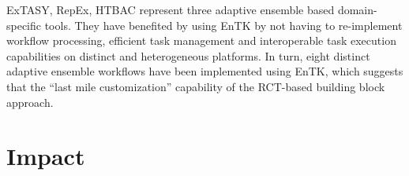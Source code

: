 \documentclass[preprint,12pt, a4paper]{elsarticle}
\begin{document}

ExTASY, RepEx, HTBAC represent three adaptive ensemble based domain-specific
tools. They have benefited by using EnTK by not having to re-implement
workflow processing, efficient task management and interoperable task
execution capabilities on distinct and heterogeneous platforms. In turn, eight
distinct adaptive ensemble workflows have been implemented using EnTK, which
suggests that the ``last mile customization'' capability of the RCT-based
building block approach.



\section{Impact}\label{sec:impact}


\end{document}
